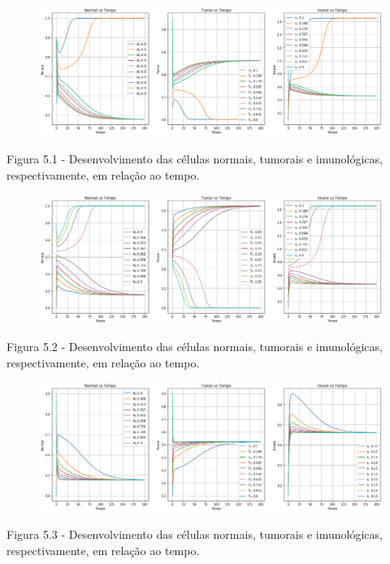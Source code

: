 \documentclass[12pt, a4paper]{article}
\begin{document}
\begin{center}
\begin{figure}[tbh!]
	\centering
    \includegraphics[scale=0.4]{imgs/res_1.png}

  \end{figure}

Figura 5.1 - Desenvolvimento das células normais, tumorais e imunológicas, respectivamente, em relação ao tempo.
\end{center}

\begin{center}
\begin{figure}[tbh!]
	\centering
    \includegraphics[scale=0.4]{imgs/res_2.png}

  \end{figure}

Figura 5.2 - Desenvolvimento das células normais, tumorais e imunológicas, respectivamente, em relação ao tempo.
\end{center}
\newpage

\begin{center}
\begin{figure}[tbh!]
	\centering
    \includegraphics[scale=0.4]{imgs/res_3.png}

  \end{figure}

Figura 5.3 - Desenvolvimento das células normais, tumorais e imunológicas, respectivamente, em relação ao tempo.
\end{center}
\end{document}
